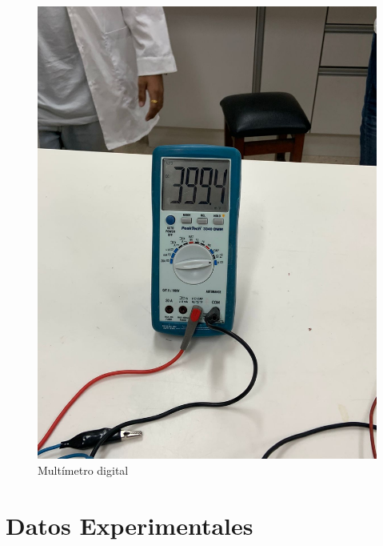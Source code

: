 \documentclass[letterpaper, 12pt]{report}
\begin{document}
\begin{figure}[H]
	\begin{center}
		\includegraphics[scale = 0.3]{./Images/4.jpeg}
		\caption{Multímetro digital}
	\end{center}
\end{figure}

\section{Datos Experimentales}
\end{document}
